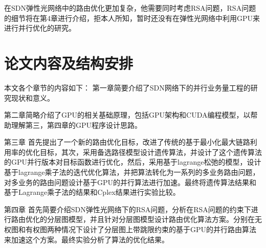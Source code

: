\documentclass[master]{thesis-uestc}
\begin{document}
 在SDN弹性光网络中的路由优化更加复杂，他需要同时考虑RSA问题，RSA问题的细节将在第4章进行介绍，拒本人所知，暂时还没有在弹性光网络中利用GPU来进行并行优化的研究。
\section{论文内容及结构安排}
本文各个章节的内容如下：
    第一章简要介绍了SDN网络下的并行业务量工程的研究现状和意义。

    第二章简略介绍了GPU的相关基础原理，包括GPU架构和CUDA编程模型，以帮助理解第三，第四章的GPU程序设计思路。

    第三章 首先提出了一个新的路由优化目标，改进了传统的基于最小化最大链路利用率的优化目标，其次，采用备选路径模型设计遗传算法，并设计了这个遗传算法的GPU并行版本对目标函数进行优化，然后，采用基于lagrange松弛的模型，设计基于lagrange乘子法的迭代优化算法，并把算法转化为一系列的多业务路由问题，对多业务的路由问题设计基于GPU的并行算法进行加速。最终将遗传算法结果和基于Lagrange乘子法的结果和Cplex结果进行实验比较。

    第四章 首先简要介绍SDN弹性光网络下的RSA问题，分析在RSA问题的约束下进行路由优化的分层图模型，并且针对分层图模型设计路由优化算法方案。分别在无权图和有权图两种情况下设计了分层图上带跳限约束的基于GPU的并行路由算法来加速这个方案。最终实验分析了算法的优化结果。



\end{document}

